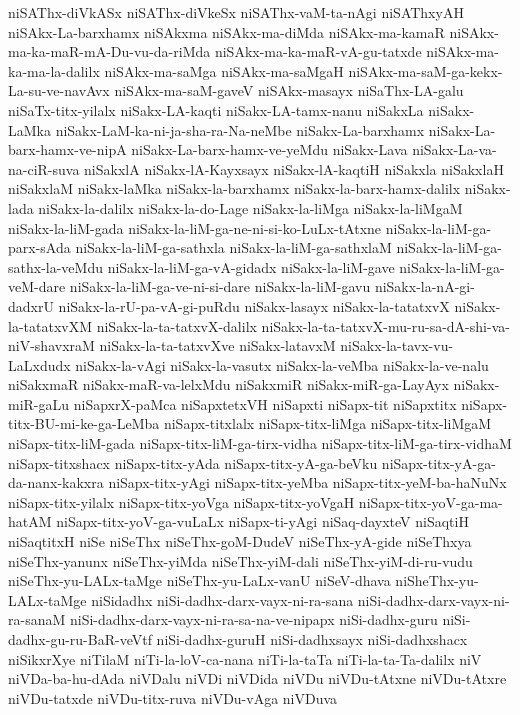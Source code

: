 {niSAThx-diVkASx
niSAThx-diVkeSx
niSAThx-vaM-ta-nAgi
niSAThxyAH
niSAkx-La-barxhamx
niSAkxma
niSAkx-ma-diMda
niSAkx-ma-kamaR
niSAkx-ma-ka-maR-mA-Du-vu-da-riMda
niSAkx-ma-ka-maR-vA-gu-tatxde
niSAkx-ma-ka-ma-la-dalilx
niSAkx-ma-saMga
niSAkx-ma-saMgaH
niSAkx-ma-saM-ga-kekx-La-su-ve-navAvx
niSAkx-ma-saM-gaveV
niSAkx-masayx
niSaThx-LA-galu
niSaTx-titx-yilalx
niSakx-LA-kaqti
niSakx-LA-tamx-nanu
niSakxLa
niSakx-LaMka
niSakx-LaM-ka-ni-ja-sha-ra-Na-neMbe
niSakx-La-barxhamx
niSakx-La-barx-hamx-ve-nipA
niSakx-La-barx-hamx-ve-yeMdu
niSakx-Lava
niSakx-La-va-na-ciR-suva
niSakxlA
niSakx-lA-Kayxsayx
niSakx-lA-kaqtiH
niSakxla
niSakxlaH
niSakxlaM
niSakx-laMka
niSakx-la-barxhamx
niSakx-la-barx-hamx-dalilx
niSakx-lada
niSakx-la-dalilx
niSakx-la-do-Lage
niSakx-la-liMga
niSakx-la-liMgaM
niSakx-la-liM-gada
niSakx-la-liM-ga-ne-ni-si-ko-LuLx-tAtxne
niSakx-la-liM-ga-parx-sAda
niSakx-la-liM-ga-sathxla
niSakx-la-liM-ga-sathxlaM
niSakx-la-liM-ga-sathx-la-veMdu
niSakx-la-liM-ga-vA-gidadx
niSakx-la-liM-gave
niSakx-la-liM-ga-veM-dare
niSakx-la-liM-ga-ve-ni-si-dare
niSakx-la-liM-gavu
niSakx-la-nA-gi-dadxrU
niSakx-la-rU-pa-vA-gi-puRdu
niSakx-lasayx
niSakx-la-tatatxvX
niSakx-la-tatatxvXM
niSakx-la-ta-tatxvX-dalilx
niSakx-la-ta-tatxvX-mu-ru-sa-dA-shi-va-niV-shavxraM
niSakx-la-ta-tatxvXve
niSakx-latavxM
niSakx-la-tavx-vu-LaLxdudx
niSakx-la-vAgi
niSakx-la-vasutx
niSakx-la-veMba
niSakx-la-ve-nalu
niSakxmaR
niSakx-maR-va-lelxMdu
niSakxmiR
niSakx-miR-ga-LayAyx
niSakx-miR-gaLu
niSapxrX-paMca
niSapxtetxVH
niSapxti
niSapx-tit
niSapxtitx
niSapx-titx-BU-mi-ke-ga-LeMba
niSapx-titxlalx
niSapx-titx-liMga
niSapx-titx-liMgaM
niSapx-titx-liM-gada
niSapx-titx-liM-ga-tirx-vidha
niSapx-titx-liM-ga-tirx-vidhaM
niSapx-titxshacx
niSapx-titx-yAda
niSapx-titx-yA-ga-beVku
niSapx-titx-yA-ga-da-nanx-kakxra
niSapx-titx-yAgi
niSapx-titx-yeMba
niSapx-titx-yeM-ba-haNuNx
niSapx-titx-yilalx
niSapx-titx-yoVga
niSapx-titx-yoVgaH
niSapx-titx-yoV-ga-ma-hatAM
niSapx-titx-yoV-ga-vuLaLx
niSapx-ti-yAgi
niSaq-dayxteV
niSaqtiH
niSaqtitxH
niSe
niSeThx
niSeThx-goM-DudeV
niSeThx-yA-gide
niSeThxya
niSeThx-yanunx
niSeThx-yiMda
niSeThx-yiM-dali
niSeThx-yiM-di-ru-vudu
niSeThx-yu-LALx-taMge
niSeThx-yu-LaLx-vanU
niSeV-dhava
niSheThx-yu-LALx-taMge
niSidadhx
niSi-dadhx-darx-vayx-ni-ra-sana
niSi-dadhx-darx-vayx-ni-ra-sanaM
niSi-dadhx-darx-vayx-ni-ra-sa-na-ve-nipapx
niSi-dadhx-guru
niSi-dadhx-gu-ru-BaR-veVtf
niSi-dadhx-guruH
niSi-dadhxsayx
niSi-dadhxshacx
niSikxrXye
niTilaM
niTi-la-loV-ca-nana
niTi-la-taTa
niTi-la-ta-Ta-dalilx
niV
niVDa-ba-hu-dAda
niVDalu
niVDi
niVDida
niVDu
niVDu-tAtxne
niVDu-tAtxre
niVDu-tatxde
niVDu-titx-ruva
niVDu-vAga
niVDuva
}

